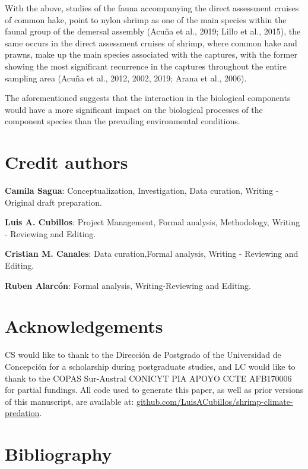 \documentclass[12pt]{article}
\begin{document}
With the above, studies of the fauna accompanying the direct assessment
cruises of common hake, point to nylon shrimp as one of the main species
within the faunal group of the demersal assembly (Acuña et al., 2019;
Lillo et al., 2015), the same occurs in the direct assessment cruises of
shrimp, where common hake and prawns, make up the main species
associated with the captures, with the former showing the most
significant recurrence in the captures throughout the entire sampling
area (Acuña et al., 2012, 2002, 2019; Arana et al., 2006).

The aforementioned suggests that the interaction in the biological
components would have a more significant impact on the biological
processes of the component species than the prevailing environmental
conditions.

\hypertarget{credit-authors}{%
\section{Credit authors}\label{credit-authors}}

\textbf{Camila Sagua}: Conceptualization, Investigation, Data curation,
Writing - Original draft preparation.

\textbf{Luis A. Cubillos}: Project Management, Formal analysis,
Methodology, Writing - Reviewing and Editing.

\textbf{Cristian M. Canales}: Data curation,Formal analysis, Writing -
Reviewing and Editing.

\textbf{Ruben Alarcón}: Formal analysis, Writing-Reviewing and Editing.

\hypertarget{acknowledgements}{%
\section{Acknowledgements}\label{acknowledgements}}

CS would like to thank to the Dirección de Postgrado of the Universidad
de Concepción for a scholarship during postgraduate studies, and LC
would like to thank to the COPAS Sur-Austral CONICYT PIA APOYO CCTE
AFB170006 for partial fundings. All code used to generate this paper, as
well as prior versions of this manuscript, are available at:
\href{https://github.com/LuisACubillos/shrimp-climate-predation}{github.com/LuisACubillos/shrimp-climate-predation}.

\FloatBarrier

\hypertarget{bibliography}{%
\section*{Bibliography}\label{bibliography}}
\end{document}
